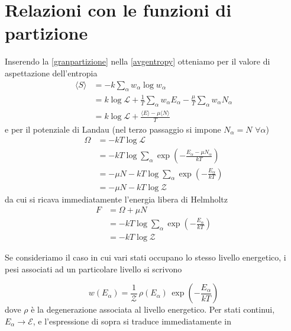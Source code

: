 \documentclass[a4paper]{report}
\begin{document}
\section{Relazioni con le funzioni di partizione}
Inserendo la \eqref{granpartizione} nella \eqref{avgentropy} otteniamo per il valore di aspettazione dell'entropia
\begin{equation}
\begin{split}
    \langle S\rangle  & = -k\sum_\alpha w_\alpha \log w_\alpha \\ 
    & = k \log \mathcal{L} + \frac{1}{T}\sum_\alpha w_\alpha E_\alpha - \frac{\mu}{T}\sum_\alpha w_\alpha N_\alpha \\
    & = k \log \mathcal{L} + \frac{\langle E \rangle-\mu \langle N \rangle}{T}
\end{split}
\end{equation}
e per il potenziale di Landau (nel terzo passaggio si impone $N_\alpha = N \,\,\forall \alpha$)
\begin{equation}
    \begin{split}
        \Omega & = -k T \log \mathcal{L}\\
        & = -k T \log\sum_\alpha \exp\left(-\frac{E_\alpha-\mu N_\alpha}{k T}\right) \\
        & = -\mu N - k T \log\sum_\alpha \exp \left(-\frac{E_\alpha}{k T}\right) \\
        & = -\mu N - k T \log \mathcal{Z}
    \end{split}
\end{equation}
da cui si ricava immediatamente l'energia libera di Helmholtz
\begin{equation}
    \begin{split}
        F & = \Omega + \mu N \\
        & = -kT \log \sum_\alpha \exp \left(-\frac{E_\alpha}{k T}\right) \\
        & = -kT \log \mathcal{Z}
    \end{split}
\end{equation}

Se consideriamo il caso in cui vari stati occupano lo stesso livello energetico, i pesi associati ad un particolare livello si scrivono

\begin{equation}
    w(E_\alpha) = \frac{1}{\mathcal{Z}} \,\rho(E_\alpha)\, \exp \left(-\frac{E_\alpha}{k T}\right)
\end{equation}
dove $\rho$ è la degenerazione associata al livello energetico. Per stati continui, $E_\alpha \rightarrow \mathcal{E}$, e l'espressione di sopra si traduce immediatamente in
\end{document}
